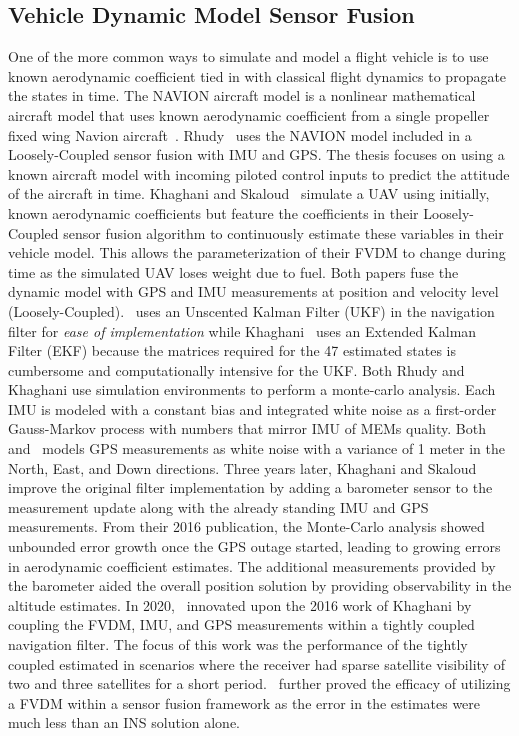 \subsection{\textbf{Vehicle Dynamic Model Sensor Fusion}}
One of the more common ways to simulate and model a flight vehicle is to use known aerodynamic coefficient tied in with classical flight dynamics to propagate the states in time. The NAVION aircraft model is a nonlinear mathematical aircraft model that uses known aerodynamic coefficient from a single propeller fixed wing Navion aircraft~\cite{nelsonFlightStabilityAutomatic1998}. Rhudy~\cite{rhudyDynamicModelaidedSensor2017} uses the NAVION model included in a Loosely-Coupled sensor fusion with IMU and GPS\@. The thesis focuses on using a known aircraft model with incoming piloted control inputs to predict the attitude of the aircraft in time. Khaghani and Skaloud~\cite{khaghaniAutonomousVehicleDynamic2016} simulate a UAV using initially, known aerodynamic coefficients but feature the coefficients in their Loosely-Coupled sensor fusion algorithm to continuously estimate these variables in their vehicle model. This allows the parameterization of their FVDM to change during time as the simulated UAV loses weight due to fuel. Both papers fuse the dynamic model with GPS and IMU measurements at position and velocity level (Loosely-Coupled).~\cite{rhudyDynamicModelaidedSensor2017} uses an Unscented Kalman Filter (UKF) in the navigation filter for \textit{ease of implementation} while Khaghani~\cite{khaghaniAutonomousVehicleDynamic2016,khaghaniAssessmentVDMbasedAutonomous2018} uses an Extended Kalman Filter (EKF) because the matrices required for the 47 estimated states is cumbersome and computationally intensive for the UKF\@. Both Rhudy and Khaghani use simulation environments to perform a monte-carlo analysis. Each IMU is modeled with a constant bias and integrated white noise as a first-order Gauss-Markov process with numbers that mirror IMU of MEMs quality. Both~\cite{khaghaniAutonomousVehicleDynamic2016} and~\cite{rhudyDynamicModelaidedSensor2017} models GPS measurements as white noise with a variance of 1 meter in the North, East, and Down directions. Three years later, Khaghani and Skaloud~\cite{khaghaniAssessmentVDMbasedAutonomous2018} improve the original filter implementation by adding a barometer sensor to the measurement update along with the already standing IMU and GPS measurements. From their 2016 publication, the Monte-Carlo analysis showed unbounded error growth once the GPS outage started, leading to growing errors in aerodynamic coefficient estimates. The additional measurements provided by the barometer aided the overall position solution by providing observability in the altitude estimates. In 2020,~\cite{mwenegohaModelbasedTightlyCoupled2020} innovated upon the 2016 work of Khaghani by coupling the FVDM, IMU, and GPS measurements within a tightly coupled navigation filter. The focus of this work was the performance of the tightly coupled estimated in scenarios where the receiver had sparse satellite visibility of two and three satellites for a short period.~\cite{mwenegohaModelbasedTightlyCoupled2020} further proved the efficacy of utilizing a FVDM within a sensor fusion framework as the error in the estimates were much less than an INS solution alone. 

